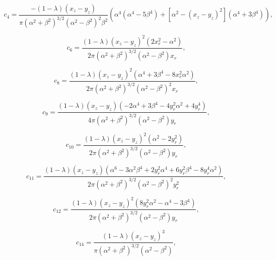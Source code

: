 \documentclass[12pt]{article}
\begin{document}
\begin{equation}
\label{equ:coeff_a4}
c_{4} = \frac{-(1 - \lambda) (x_{z} - y_{z})}{\pi (\alpha^{2} + \beta^{2})^{3/2} (\alpha^{2} - \beta^{2})^{2} \beta^{2}} \left(\alpha^{4} (\alpha^{4} - 5 \beta^{4}) + [\alpha^{2}- (x_{z} - y_{z})^{2}] (\alpha^{4} + 3 \beta^{4}) \right),
\end{equation}

\begin{equation}
\label{equ:coeff_a6}
c_{6} = \frac{(1 - \lambda) (x_{z} - y_{z})^{2} (2 x_{r}^{2} - \alpha^{2})}{2 \pi (\alpha^{2} + \beta^{2})^{3/2} (\alpha^{2} - \beta^{2}) x_{r}},
\end{equation}

\begin{equation}
\label{equ:coeff_a8}
c_{8} = \frac{(1 - \lambda) (x_{z} - y_{z})^{2} (\alpha^{4} + 3 \beta^{4} - 8 x_{r}^{2} \alpha^{2})}{2 \pi (\alpha^{2} + \beta^{2})^{3/2} (\alpha^{2} - \beta^{2})^{2} x_{r}},
\end{equation}

\begin{equation}
\label{equ:coeff_a9}
c_{9} = \frac{(1 - \lambda) (x_{z} - y_{z}) (-2 \alpha^{4} + 3 \beta^{4} - 4 y_{r}^{2} \alpha^{2} + 4 y_{r}^{4})}{4 \pi (\alpha^{2} + \beta^{2})^{3/2} (\alpha^{2} - \beta^{2}) y_{r}},
\end{equation}

\begin{equation}
\label{equ:coeff_a10}
c_{10} = \frac{(1 - \lambda) (x_{z} - y_{z})^{2} (\alpha^{2} - 2 y_{r}^{2})}{2 \pi (\alpha^{2} + \beta^{2})^{3/2} (\alpha^{2} - \beta^{2}) y_{r}},
\end{equation}

\begin{equation}
\label{equ:coeff_a11}
c_{11} = \frac{(1 - \lambda) (x_{z} - y_{z}) (\alpha^{6} - 3 \alpha^{2} \beta^{4} + 2 y_{r}^{2} \alpha^{4} + 6 y_{r}^{2} \beta^{4} - 8 y_{r}^{4} \alpha^{2})}{2 \pi (\alpha^{2} + \beta^{2})^{3/2} (\alpha^{2} - \beta^{2})^{2} y_{r}^{2}},
\end{equation}

\begin{equation}
\label{equ:coeff_a12}
c_{12} = \frac{(1 - \lambda) (x_{z} - y_{z})^{2} (8 y_{r}^{2} \alpha^{2} - \alpha^{4} - 3 \beta^{4})}{2 \pi (\alpha^{2} + \beta^{2})^{3/2} (\alpha^{2} - \beta^{2}) y_{r}},
\end{equation}

\begin{equation}
\label{equ:coeff_a14}
c_{14} = \frac{(1 - \lambda) (x_{z} - y_{z})^{3}}{\pi (\alpha^{2} + \beta^{2})^{3/2} (\alpha^{2} - \beta^{2})},
\end{equation}
\end{document}
